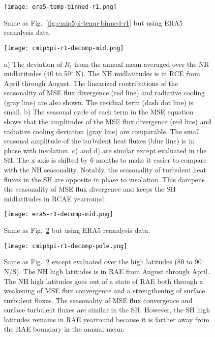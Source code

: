 \documentclass{ametsocV5}
\begin{document}
\begin{figure}[t]
  \noindent\texttt{[image: era5-temp-binned-r1.png]}\\
  \caption{Same as Fig.~\ref{fig:cmip5pi-temp-binned-r1} but using ERA5 reanalysis data.}
  \label{fig:era5-temp-binned-r1}
\end{figure}

\begin{figure}[t]
  \noindent\texttt{[image: cmip5pi-r1-decomp-mid.png]}\\
  \caption{a) The deviation of \(R_{1}\) from the annual mean averaged over the NH midlatitudes (40 to 50$^{\circ}$ N). The NH midlatitudes is in RCE from April through August. The linearized contributions of the seasonality of MSE flux divergence (red line) and radiative cooling (gray line) are also shown. The residual term (dash dot line) is small. b) The seasonal cycle of each term in the MSE equation shows that the amplitudes of the MSE flux divergence (red line) and radiative cooling deviation (gray line) are comparable. The small seasonal amplitude of the turbulent heat fluxes (blue line) is in phase with insolation. c) and d) are similar except evaluated in the SH. The x axis is shifted by 6 months to make it easier to compare with the NH seasonality. Notably, the seasonality of turbulent heat fluxes in the SH are opposite in phase to insolation. This dampens the seasonality of MSE flux divergence and keeps the SH midlatitudes in RCAE yearround.}
  \label{fig:cmip5pi-r1-decomp-mid}
\end{figure}

\begin{figure}[t]
  \noindent\texttt{[image: era5-r1-decomp-mid.png]}\\
  \caption{Same as Fig.~\ref{fig:cmip5pi-r1-decomp-mid} but using ERA5 reanalysis data.}
  \label{fig:era5-r1-decomp-mid}
\end{figure}

\begin{figure}[t]
  \noindent\texttt{[image: cmip5pi-r1-decomp-pole.png]}\\
  \caption{Same as Fig.~\ref{fig:cmip5pi-r1-decomp-mid} except evaluated over the high latitudes (80 to 90$^{\circ}$ N/S). The NH high latitudes is in RAE from August through April. The NH high latitudes goes out of a state of RAE both through a weakening of MSE flux convergence and a strengthening of surface turbulent fluxes. The seasonality of MSE flux convergence and surface turbulent fluxes are similar in the SH. However, the SH high latitudes remains in RAE yearround because it is farther away from the RAE boundary in the annual mean.}
  \label{fig:cmip5pi-r1-decomp-pole}
\end{figure}
\end{document}
